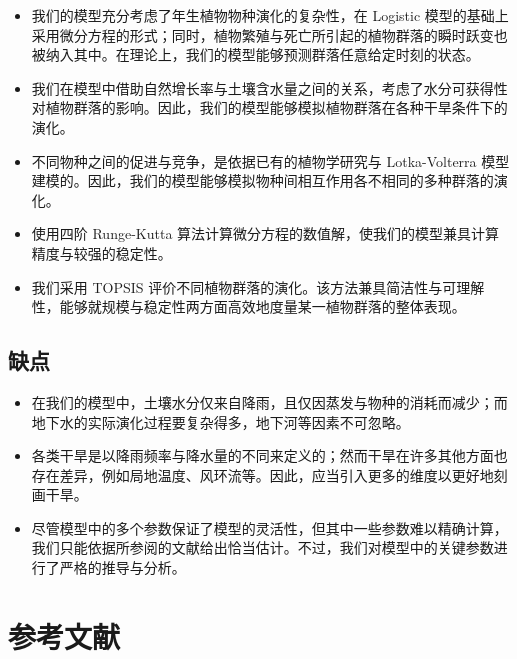 \documentclass[11pt,a4paper]{ctexart}
\begin{document}
\begin{itemize}
\item 我们的模型充分考虑了年生植物物种演化的复杂性，在 Logistic 模型的基础上采用微分方程的形式；同时，植物繁殖与死亡所引起的植物群落的瞬时跃变也被纳入其中。在理论上，我们的模型能够预测群落任意给定时刻的状态。
\item 我们在模型中借助自然增长率与土壤含水量之间的关系，考虑了水分可获得性对植物群落的影响。因此，我们的模型能够模拟植物群落在各种干旱条件下的演化。
\item 不同物种之间的促进与竞争，是依据已有的植物学研究与 Lotka-Volterra 模型建模的。因此，我们的模型能够模拟物种间相互作用各不相同的多种群落的演化。
\item 使用四阶 Runge-Kutta 算法计算微分方程的数值解，使我们的模型兼具计算精度与较强的稳定性。
\item 我们采用 TOPSIS 评价不同植物群落的演化。该方法兼具简洁性与可理解性，能够就规模与稳定性两方面高效地度量某一植物群落的整体表现。
\end{itemize}

\subsection{缺点}

\begin{itemize}
\item 在我们的模型中，土壤水分仅来自降雨，且仅因蒸发与物种的消耗而减少；而地下水的实际演化过程要复杂得多，地下河等因素不可忽略。
\item 各类干旱是以降雨频率与降水量的不同来定义的；然而干旱在许多其他方面也存在差异，例如局地温度、风环流等。因此，应当引入更多的维度以更好地刻画干旱。
\item 尽管模型中的多个参数保证了模型的灵活性，但其中一些参数难以精确计算，我们只能依据所参阅的文献给出恰当估计。不过，我们对模型中的关键参数进行了严格的推导与分析。
\end{itemize}

\section*{参考文献}
\end{document}
